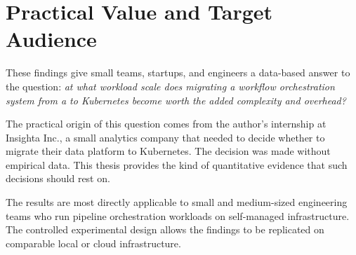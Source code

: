 \section{Practical Value and Target Audience}

These findings give small teams, startups, and engineers a data-based answer to the
question: \textit{at what workload scale does migrating a workflow orchestration system from
a \vm{} to Kubernetes become worth the added complexity and overhead?}

The practical origin of this question comes from the author's internship at Insighta Inc.,
a small analytics company that needed to decide whether to migrate their \dagster{} data
platform to Kubernetes. The decision was made without empirical data. This thesis provides
the kind of quantitative evidence that such decisions should rest on.

The results are most directly applicable to small and medium-sized engineering teams who
run pipeline orchestration workloads on self-managed infrastructure. The controlled
experimental design allows the findings to be replicated on comparable local or cloud
infrastructure.
